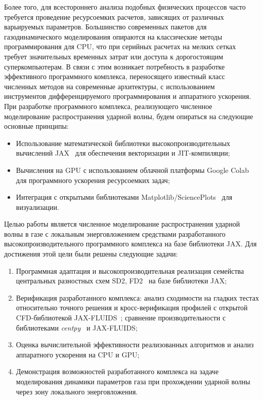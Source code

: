 \documentclass[a4paper,14pt]{extarticle}
\theoremstyle{theorem}
\theoremstyle{lemma}
\begin{document}
    Более того, для всестороннего анализа подобных физических процессов часто требуется проведение ресурсоемких расчетов, зависящих от различных варьируемых параметров. 
    Большинство современных пакетов  для газодинамического моделирования опираются на классические методы программирования для CPU, что при серийных расчетах на мелких сетках требует значительных временных затрат или доступа к дорогостоящим суперкомпьютерам. В связи с этим возникает потребность в разработке эффективного программного комплекса, переносящего известный класс численных методов на современные архитектуры, с использованием инструментов дифференцируемого программирования и аппаратного ускорения. При разработке программного комплекса, реализующего численное моделирование распространения ударной волны, будем опираться на следующие основные принципы:

    \begin{itemize}
        \item Использование математической библиотеки высокопроизводительных вычислений JAX~\cite{jax} для обеспечения векторизации и JIT-компиляции;
        \item Вычисления на GPU с использованием облачной платформы Google Colab для программного ускорения ресурсоемких задач;
        \item Интеграция с открытыми библиотеками Matplotlib/SciencePlots~\cite{matplotlib} для визуализации.
    \end{itemize}

    Целью работы является численное моделирование распространения ударной волны в газе с локальным энерговложением средствами разработанного высокопроизводительного программного комплекса на базе библиотеки JAX. Для достижения этой цели были решены следующие задачи:

    \begin{enumerate}
        \item Программная адаптация и высокопроизводительная реализация семейства центральных разностных схем SD2, FD2~\cite{nessyahu1990,kurganov2000} на базе библиотеки JAX;
         \item Верификация разработанного комплекса: анализ сходимости на гладких тестах относительно точного решения и кросс-верификация профилей с открытой CFD-библиотекой JAX-FLUIDS~\cite{jaxfluids}; сравнение производительности с библиотеками \textit{centpy}~\cite{centpy} и JAX-FLUIDS;
        \item Оценка вычислительной эффективности реализованных алгоритмов и анализ аппаратного ускорения на CPU и GPU;
        \item Демонстрация возможностей разработанного комплекса на задаче моделирования динамики параметров газа при прохождении ударной волны через зону локального энерговложения.
    \end{enumerate}
\end{document}
